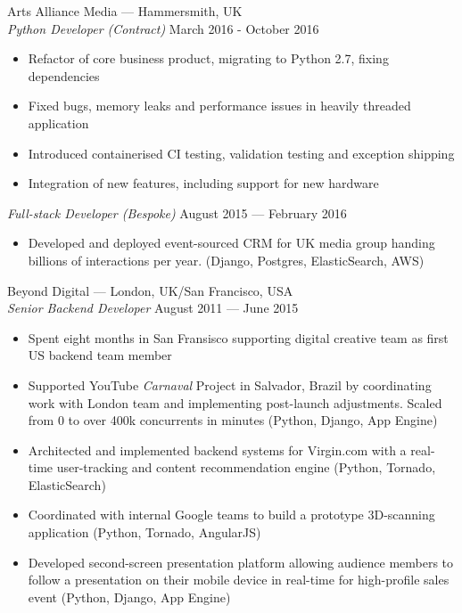 \documentclass[margin, 10pt]{res}
\begin{document}
\begin{resume}
Arts Alliance Media --- Hammersmith, UK \\
{\sl Python Developer (Contract)} \hfill March 2016 - October 2016 \\

\begin{itemize} \itemsep -1pt
\item Refactor of core business product, migrating to Python 2.7, fixing dependencies
\item Fixed bugs, memory leaks and performance issues in heavily threaded application
\item Introduced containerised CI testing, validation testing and exception shipping
\item Integration of new features, including support for new hardware
\end{itemize}

{\sl Full-stack Developer (Bespoke)} \hfill August 2015 --- February 2016 \\

\begin{itemize}
\item Developed and deployed event-sourced CRM for UK media group handing billions of
interactions per year. (Django, Postgres, ElasticSearch, AWS)
\end{itemize}

Beyond Digital --- London, UK/San Francisco, USA \\
{\sl Senior Backend Developer} \hfill August 2011 --- June 2015 \\

\begin{itemize} \itemsep -1pt
\item Spent eight months in San Fransisco supporting digital creative team as first US backend team member
\item Supported YouTube \textit{Carnaval} Project in Salvador, Brazil by coordinating work with London team and implementing post-launch adjustments. Scaled from 0 to over 400k concurrents in minutes (Python, Django, App Engine)
\item Architected and implemented backend systems for Virgin.com with a real-time user-tracking and content recommendation engine (Python, Tornado, ElasticSearch)
\item Coordinated with internal Google teams to build a prototype 3D-scanning application (Python, Tornado, AngularJS)
\item Developed second-screen presentation platform allowing audience members to follow a presentation on their mobile device in real-time for high-profile sales event (Python, Django, App Engine)
\end{itemize}


\end{resume}
\end{document}

